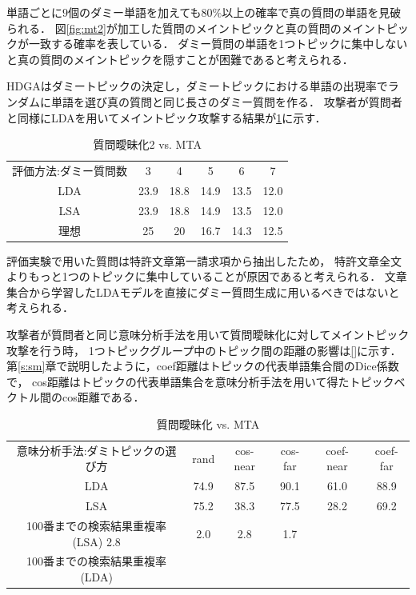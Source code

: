 \documentclass[master]{suribt}
\theoremstyle{definition}
\begin{document}
 単語ごとに$9$個のダミー単語を加えても$80\%$以上の確率で真の質問の単語を見破られる．
 図\ref{fig:mt2}が加工した質問のメイントピックと真の質問のメイントピックが一致する確率を表している．
 ダミー質問の単語を1つトピックに集中しないと真の質問のメイントピックを隠すことが困難であると考えられる．
 
 HDGAはダミートピックの決定し，ダミートピックにおける単語の出現率でランダムに単語を選び真の質問と同じ長さのダミー質問を作る．
 攻撃者が質問者と同様にLDAを用いてメイントピック攻撃する結果が\ref{tab:mt:HDGA1}に示す．

 \begin{table}[!hbp]
 \center
 \begin{tabular}{|c|c|c|c|c|c|}
 \hline
 評価方法:ダミー質問数  & 3 & 4 & 5 & 6 & 7    \\
 LDA & 23.9 & 18.8 & 14.9 & 13.5 & 12.0 \\
 LSA & 23.9 & 18.8 & 14.9 & 13.5 & 12.0 \\
 理想 & 25 & 20 & 16.7 & 14.3 & 12.5 \\
 \hline
 \end{tabular}
 \label{tab:mt:HDGA1}
 \caption{質問曖昧化2 vs. MTA}
 \end{table}

 評価実験で用いた質問は特許文章第一請求項から抽出したため，
 特許文章全文よりもっと1つのトピックに集中していることが原因であると考えられる．
 文章集合から学習したLDAモデルを直接にダミー質問生成に用いるべきではないと考えられる．

 攻撃者が質問者と同じ意味分析手法を用いて質問曖昧化に対してメイントピック攻撃を行う時，
 1つトピックグループ中のトピック間の距離の影響は\ref{}に示す．
 第\ref{s:sm}章で説明したように，coef距離はトピックの代表単語集合間のDice係数で，
 cos距離はトピックの代表単語集合を意味分析手法を用いて得たトピックベクトル間のcos距離である．

 \begin{table}[!hbp]
 \center
 \begin{tabular}{|c|c|c|c|c|c|}
 \hline
 意味分析手法:ダミトピックの選び方 & rand & cos-near & cos-far & coef-near & coef-far \\
 LDA & 74.9 & 87.5  & 90.1  & 61.0 & 88.9 \\
 LSA &  75.2 & 38.3 & 77.5 & 28.2 & 69.2 \\
 100番までの検索結果重複率(LSA) 2.8 & 2.0 & 2.8 & 1.7 \\ 
 100番までの検索結果重複率(LDA)  &  &  &  \\ 
 \hline
 \end{tabular}
 \caption{質問曖昧化 vs. MTA}
 \end{table}
\end{document}
